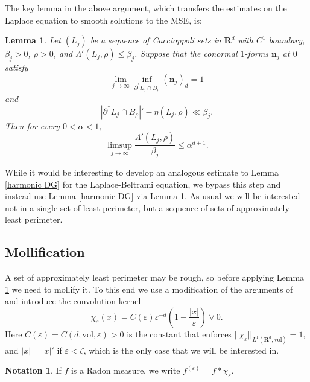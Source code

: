 \documentclass[reqno,12pt,letterpaper]{amsart}
\newcommand{\RR}{\mathbf{R}}
\newcommand{\normal}{\mathbf n}
\newcommand{\vol}{\mathrm{vol}}
\newtheorem{lemma}[theorem]{Lemma}
\theoremstyle{definition}
\newtheorem{notation}[theorem]{Notation}
\numberwithin{equation}{section}
\begin{document}
The key lemma \cite[Teorema 4.4]{Miranda66} in the above argument, which transfers the estimates on the Laplace equation to smooth solutions to the MSE, is:

\begin{lemma}\label{Giusti64}
Let $(L_j)$ be a sequence of Caccioppoli sets in $\RR^d$ with $C^1$ boundary, $\beta_j > 0$, $\rho > 0$, and $\Lambda'(L_j, \rho) \leq \beta_j$.
Suppose that the conormal $1$-forms $\normal_j$ at $0$ satisfy
$$\lim_{j \to \infty} \inf_{\partial^* L_j \cap B_\rho} (\normal_j)_d = 1$$
and
$$|\partial^* L_j \cap B_\rho|' - \eta(L_j, \rho) \ll \beta_j.$$
Then for every $0 < \alpha < 1$,
$$\limsup_{j \to \infty} \frac{\Lambda'(L_j, \rho)}{\beta_j} \leq \alpha^{d + 1}.$$
\end{lemma}

While it would be interesting to develop an analogous estimate to Lemma \ref{harmonic DG} for the Laplace-Beltrami equation, we bypass this step and instead use Lemma \ref{harmonic DG} via Lemma \ref{Giusti64}.
As usual we will be interested not in a single set of least perimeter, but a sequence of sets of approximately least perimeter.

\subsection{Mollification}
A set of approximately least perimeter may be rough, so before applying Lemma \ref{Giusti64} we need to mollify it.
To this end we use a modification of the arguments of \cite[Chapter 7]{Giusti77} and introduce the convolution kernel
$$\chi_\varepsilon(x) = C(\varepsilon) \varepsilon^{-d}\left(1 - \frac{|x|}{\varepsilon}\right) \vee 0.$$
Here $C(\varepsilon) = C(d, \vol, \varepsilon) > 0$ is the constant that enforces $||\chi_\varepsilon||_{L^1(\RR^d, \vol)} = 1$, and $|x| = |x|'$ if $\varepsilon < \zeta$, which is the only case that we will be interested in.

\begin{notation}
If $f$ is a Radon measure, we write $f^{(\varepsilon)} = f * \chi_\varepsilon$.
\end{notation}
\end{document}
